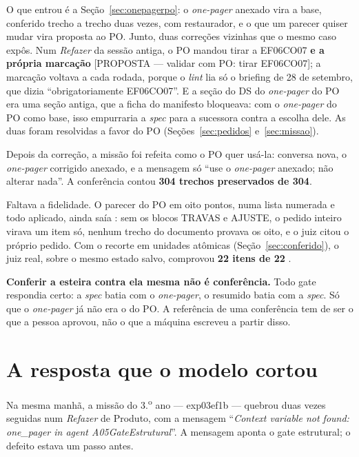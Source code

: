 \documentclass[11pt,a4paper]{article}
\newcommand{\cod}[1]{{\ttfamily\small #1}}
\newcommand{\bolinha}[1]{\tikz[baseline=-0.5ex]{\fill[#1] (0,0) circle (0.33em);}}
\newcommand{\statusVerde}{\bolinha{sinalVerde}}
\newcommand{\statusVermelho}{\bolinha{sinalVermelho}}
\begin{document}
O que entrou é a Seção~\ref{sec:onepagerpo}: o \emph{one-pager} anexado vira a base, conferido trecho a trecho duas vezes, com restaurador, e o que um parecer quiser mudar vira proposta ao PO. Junto, duas correções vizinhas que o mesmo caso expôs. Num \emph{Refazer} da sessão antiga, o PO mandou tirar a EF06CO07 \textbf{e a própria marcação} \cod{[PROPOSTA — validar com PO: tirar EF06CO07]}; a marcação voltava a cada rodada, porque o \emph{lint} lia só o briefing de 28 de setembro, que dizia ``obrigatoriamente EF06CO07''. E a seção do DS do \emph{one-pager} do PO era uma seção antiga, que a ficha do manifesto bloqueava: com o \emph{one-pager} do PO como base, isso empurraria a \emph{spec} para a sucessora contra a escolha dele. As duas foram resolvidas a favor do PO (Seções~\ref{sec:pedidos} e~\ref{sec:missao}).

Depois da correção, a missão foi refeita como o PO quer usá-la: conversa nova, o \emph{one-pager} corrigido anexado, e a mensagem só ``use o \emph{one-pager} anexado; não alterar nada''. A conferência contou \textbf{304 trechos preservados de 304}.

Faltava a fidelidade. O parecer do PO em oito pontos, numa lista numerada e todo aplicado, ainda saía \statusVermelho: sem os blocos TRAVAS e AJUSTE, o pedido inteiro virava um item só, nenhum trecho do documento provava os oito, e o juiz citou o próprio pedido. Com o recorte em unidades atômicas (Seção~\ref{sec:conferido}), o juiz real, sobre o mesmo estado salvo, comprovou \textbf{22 itens de 22} \statusVerde.

\begin{destaque}
\textbf{Conferir a esteira contra ela mesma não é conferência.} Todo gate respondia certo: a \emph{spec} batia com o \emph{one-pager}, o resumido batia com a \emph{spec}. Só que o \emph{one-pager} já não era o do PO. A referência de uma conferência tem de ser o que a pessoa aprovou, não o que a máquina escreveu a partir disso.
\end{destaque}

\section{A resposta que o modelo cortou}
\label{sec:exp03}

Na mesma manhã, a missão do 3.\textsuperscript{o} ano --- \cod{exp03ef1b} --- quebrou duas vezes seguidas num \emph{Refazer} de Produto, com a mensagem ``\emph{Context variable not found: one\_pager in agent A05GateEstrutural}''. A mensagem aponta o gate estrutural; o defeito estava um passo antes.
\end{document}
